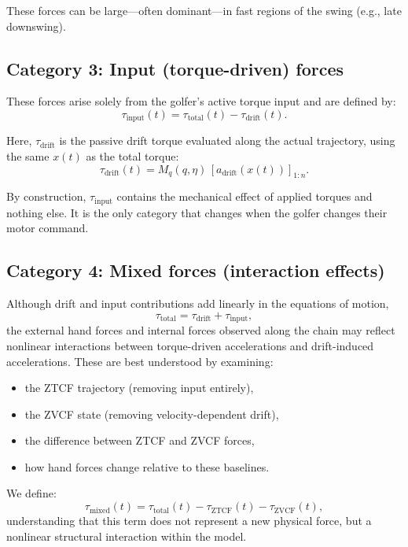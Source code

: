 \documentclass[12pt]{article}
\begin{document}
These forces can be large---often dominant---in fast regions of the swing (e.g., late downswing).

\subsection{Category 3: Input (torque-driven) forces}

These forces arise solely from the golfer’s active torque input and are defined by:
\begin{equation}
  \tau_{\mathrm{input}}(t)
  =
  \tau_{\text{total}}(t) - \tau_{\text{drift}}(t).
  \label{eq:input_tau_tax}
\end{equation}

Here, \(\tau_{\text{drift}}\) is the passive drift torque evaluated along the actual trajectory, using the same \(x(t)\) as the total torque:
\begin{equation}
  \tau_{\text{drift}}(t)
  =
  M_q(q,\eta)\,[a_{\text{drift}}(x(t))]_{1:n}.
\end{equation}

By construction, \(\tau_{\mathrm{input}}\) contains the mechanical effect of applied torques and nothing else. It is the only category that changes when the golfer changes their motor command.

\subsection{Category 4: Mixed forces (interaction effects)}

Although drift and input contributions add linearly in the equations of motion,
\[
  \tau_{\text{total}} = \tau_{\text{drift}} + \tau_{\text{input}},
\]
the external hand forces and internal forces observed along the chain may reflect nonlinear interactions between torque-driven accelerations and drift-induced accelerations. These are best understood by examining:
\begin{itemize}
  \item the ZTCF trajectory (removing input entirely),
  \item the ZVCF state (removing velocity-dependent drift),
  \item the difference between ZTCF and ZVCF forces,
  \item how hand forces change relative to these baselines.
\end{itemize}

We define:
\begin{equation}
  \tau_{\mathrm{mixed}}(t)
  =
  \tau_{\text{total}}(t)
  -
  \tau_{\mathrm{ZTCF}}(t)
  -
  \tau_{\mathrm{ZVCF}}(t),
  \label{eq:mixed_forces}
\end{equation}
understanding that this term does not represent a new physical force, but a nonlinear structural interaction within the model.
\end{document}

